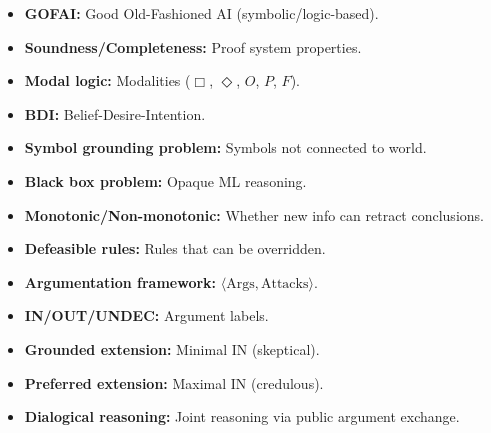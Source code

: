 \begin{defbox}
\begin{itemize}
  \item \textbf{GOFAI:} Good Old-Fashioned AI (symbolic/logic-based).
  \item \textbf{Soundness/Completeness:} Proof system properties.
  \item \textbf{Modal logic:} Modalities ($\Box$, $\Diamond$, $O$, $P$, $F$).
  \item \textbf{BDI:} Belief-Desire-Intention.
  \item \textbf{Symbol grounding problem:} Symbols not connected to world.
  \item \textbf{Black box problem:} Opaque ML reasoning.
  \item \textbf{Monotonic/Non-monotonic:} Whether new info can retract conclusions.
  \item \textbf{Defeasible rules:} Rules that can be overridden.
  \item \textbf{Argumentation framework:} $\langle \text{Args}, \text{Attacks} \rangle$.
  \item \textbf{IN/OUT/UNDEC:} Argument labels.
  \item \textbf{Grounded extension:} Minimal IN (skeptical).
  \item \textbf{Preferred extension:} Maximal IN (credulous).
  \item \textbf{Dialogical reasoning:} Joint reasoning via public argument exchange.
\end{itemize}
\end{defbox}

